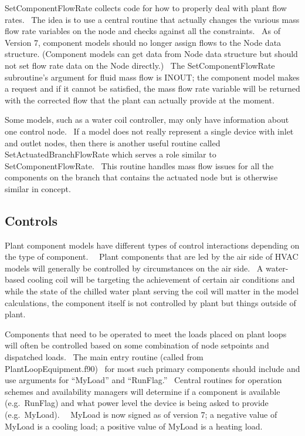 SetComponentFlowRate collects code for how to properly deal with plant flow rates.~ The idea is to use a central routine that actually changes the various mass flow rate variables on the node and checks against all the constraints.~ As of Version 7, component models should no longer assign flows to the Node data structure. (Component models can get data from Node data structure but should not set flow rate data on the Node directly.)~ The SetComponentFlowRate subroutine's argument for fluid mass flow is INOUT; the component model makes a request and if it cannot be satisfied, the mass flow rate variable will be returned with the corrected flow that the plant can actually provide at the moment.

Some models, such as a water coil controller, may only have information about one control node.~ If a model does not really represent a single device with inlet and outlet nodes, then there is another useful routine called SetActuatedBranchFlowRate which serves a role similar to SetComponentFlowRate.~ This routine handles mass flow issues for all the components on the branch that contains the actuated node but is otherwise similar in concept.

\subsection{Controls}\label{controls}

Plant component models have different types of control interactions depending on the type of component.~~ Plant components that are led by the air side of HVAC models will generally be controlled by circumstances on the air side.~ A water-based cooling coil will be targeting the achievement of certain air conditions and while the state of the chilled water plant serving the coil will matter in the model calculations, the component itself is not controlled by plant but things outside of plant.

Components that need to be operated to meet the loads placed on plant loops will often be controlled based on some combination of node setpoints and dispatched loads.~ The main entry routine (called from PlantLoopEquipment.f90)~ for most such primary components should include and use arguments for ``MyLoad'' and ``RunFlag.''~ Central routines for operation schemes and availability managers will determine if a component is available (e.g.~RunFlag) and what power level the device is being asked to provide (e.g.~MyLoad).~~ MyLoad is now signed as of version 7; a negative value of MyLoad is a cooling load; a positive value of MyLoad is a heating load.

